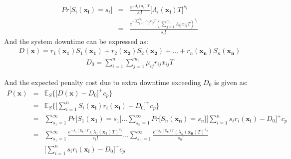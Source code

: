 \documentclass[preprint,12pt]{elsarticle}
\begin{document}
\begin {eqnarray}
Pr\bigg[S_{i}(\boldsymbol{x_i})=s_{i}\bigg]&=&\frac{e^{-\Lambda_{i}(\boldsymbol x_{i})T}}{s_{i}!}{\bigg[\Lambda_{i}(\boldsymbol{x_{i}})T\bigg]}^{s_{i}} \nonumber\\
&=& \frac{e^{-\sum_{j=1}^{m_{i}}{\Lambda_{ij}x_{ij}T}}(\sum_{j=1}^{m_{i}}{\Lambda_{ij}x_{ij}T})^{s_{i}}}{s_{i}!}
\end {eqnarray}
And the system downtime can be expressed as:
\begin{eqnarray}
D(\boldsymbol{x})= r_{1}(\boldsymbol{x_{1}})S_{1}(\boldsymbol{x_{1}})+r_{2}(\boldsymbol{x_{2}})S_{2}(\boldsymbol{x_{2}})+\ldots+r_{n}(\boldsymbol{x_{n}})S_{n}(\boldsymbol{x_{n}})
\label{D}
\end{eqnarray}
\begin{eqnarray}
D_{0} = \sum_{i=1}^{n}{\sum_{j=1}^{m_{i}}{\mu_{ij}r_{ij}x_{ij}T}} \label{D0}
\end{eqnarray}

And the expected penalty cost due to extra downtime exceeding $D_0$ is given as:
\begin{eqnarray}
P(\boldsymbol{x})& = & \mathbb{E}_{S}\bigg\{\bigg[D(\boldsymbol{x})-D_{0}\bigg]^{+} c_{p} \bigg\} \nonumber\\
&=& \mathbb{E}_{S}\bigg\{\bigg[\sum_{i=1}^{n}{S_{i}(\boldsymbol{x_{i}})r_{i}(\boldsymbol{x_i})}-D_{0}\bigg]^{+} c_{p} \bigg\} \nonumber\\
&=&\sum_{s_{1}=1}^{\infty}{Pr\bigg[S_{1}(\boldsymbol{x_{1}})=s_{1}\bigg]}\dots\sum_{s_{n}=1}^{\infty}{Pr\bigg[S_{n}(\boldsymbol{x_{n}})=s_{n}\bigg]} \bigg[\sum_{i=1}^{n}{s_{i}r_{i}(\boldsymbol{x_{i}})}-D_{0}\bigg]^{+}c_{p} \nonumber\\
&=& \sum_{s_{1}=1}^{\infty}{\frac{e^{-\lambda_{1}(\boldsymbol{x_{1}})T}(\lambda_{1}(\boldsymbol{x_{1}})T)^{s_{1}}}{s_{1}!}}\dots\sum_{s_{n}=1}^{\infty}{\frac{e^{-\lambda_{n}(\boldsymbol{x_{n}})T}(\lambda_{n}(\boldsymbol{x_{n}})T)^{s_{n}}}{s_{n}!}} \nonumber\\
 &&\bigg[\sum_{i=1}^{n}{s_{i}r_{i}(\boldsymbol{x_{i}})}-D_{0}\bigg]^{+}c_{p}
\end{eqnarray}
\end{document}
